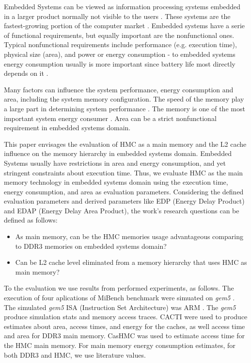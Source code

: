 \documentclass{sig-alternate-05-2015}
\begin{document}
Embedded Systems can be viewed as information processing systems embedded in a larger product normally not visible to the users \cite{marwedel2006embedded}. These systems are the fastest-growing portion of the computer market \cite{conte_in_hennessypatterson:2012}. Embedded systems have a serie of functional requirements, but equally important are the nonfunctional ones. Typical nonfunctional requirements include performance (e.g. execution time), physical size (area), and power or energy consumption - to embedded systems energy consumption usually is more important since battery life most directly depends on it \cite{wolf2012:computers}. 

Many factors can influence the system performance, energy consumption and area, including the system memory configuration. The speed of the memory play a large part in determining system performance \cite{wolf2012:computers}.
The memory is one of the most important system energy consumer \cite{vogelsang2010understanding}. Area can be a strict nonfunctional requirement in embedded systems domain.

This paper envisages the evaluation of HMC as a main memory and the L2 cache influence on the memory hierarchy in embedded systems domain. Embedded Systems usually have restrictions in area and energy consumption, and yet stringent constraints about execution time. Thus, we evaluate HMC as the main memory technology in embedded systems domain using the execution time, energy consumption, and area as evaluation parameters. Considering the defined evaluation parameters and derived parameters like EDP (Energy Delay Product) and EDAP (Energy Delay Area Product), the work's research questions can be defined as follows:
\begin{itemize}
\item As main memory, can be the HMC memories usage advantageous comparing
to DDR3 memories on embedded systems domain?
\item Can be L2 cache level eliminated from a memory hierarchy that uses
HMC as main memory?
\end{itemize}
To the evaluation we use results from performed experiments, as follows. The execution of four aplications of MiBench \cite{Guthaus:2001:Mibench} benchmark were simuated on \emph{gem5} \cite{binkert2011gem5}. The simulated \emph{gem5} ISA (Instruction Set Architecture) was ARM \cite{ARM:2017}. The \emph{gem5} produce simulation stats and memory access traces. CACTI \cite{WiltonJouppi:CACTI:1996} were used to produce estimates about area, access times, and energy for the caches, as well access time and area for DDR3 main memory. CasHMC \cite{jeon2017cashmc} was used to estimate access time for the HMC main memory. For main memory energy consumption estimates, for both DDR3 and HMC, we use literature values.
\end{document}

